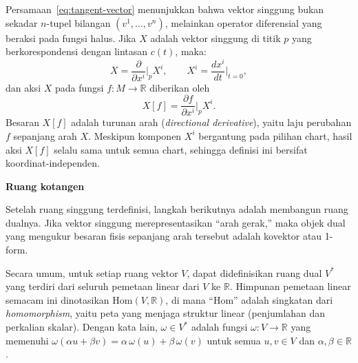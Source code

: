 Persamaan~\eqref{eq:tangent-vector} menunjukkan bahwa vektor singgung bukan sekadar $n$-tupel bilangan $(v^1, \ldots, v^n)$, melainkan operator diferensial yang beraksi pada fungsi halus. Jika $X$ adalah vektor singgung di titik $p$ yang berkorespondensi dengan lintasan $c(t)$, maka:
\begin{equation}\label{eq:operator-X}
    X = \frac{\partial}{\partial x^i}\bigg|_p X^i, \qquad X^i = \frac{dx^i}{dt}\bigg|_{t=0},
\end{equation}
dan aksi $X$ pada fungsi $f : M \to \mathbb{R}$ diberikan oleh
\begin{equation}\label{eq:vec-action}
    X[f] = \frac{\partial f}{\partial x^i}\bigg|_p X^i.
\end{equation}
Besaran $X[f]$ adalah turunan arah (\textit{directional derivative}), yaitu laju perubahan $f$ sepanjang arah $X$. Meskipun komponen $X^i$ bergantung pada pilihan chart, hasil aksi $X[f]$ selalu sama untuk semua chart, sehingga definisi ini bersifat koordinat-independen.

\vspace{0.5em}
\vspace{0.5em}
\noindent \textbf{Ruang kotangen}

Setelah ruang singgung terdefinisi, langkah berikutnya adalah membangun ruang dualnya. Jika vektor singgung merepresentasikan ``arah gerak,'' maka objek dual yang mengukur besaran fisis sepanjang arah tersebut adalah kovektor atau 1-form.

Secara umum, untuk setiap ruang vektor $V$, dapat didefinisikan ruang dual $V^*$ yang terdiri dari seluruh pemetaan linear dari $V$ ke $\mathbb{R}$. Himpunan pemetaan linear semacam ini dinotasikan $\mathrm{Hom}(V, \mathbb{R})$, di mana ``Hom'' adalah singkatan dari \textit{homomorphism}, yaitu peta yang menjaga struktur linear (penjumlahan dan perkalian skalar). Dengan kata lain, $\omega \in V^*$ adalah fungsi $\omega : V \to \mathbb{R}$ yang memenuhi $\omega(\alpha u + \beta v) = \alpha\,\omega(u) + \beta\,\omega(v)$ untuk semua $u, v \in V$ dan $\alpha, \beta \in \mathbb{R}$.

